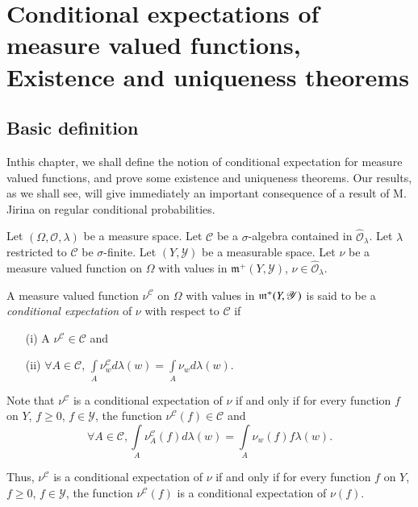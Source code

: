 
\chapter[Conditional expectations of measure valued...]{Conditional expectations of measure valued functions,
  Existence and uniqueness theorems}\label{part1:chap3}

\section{Basic definition}\label{part1:chap3:sec1}

In\pageoriginale this chapter, we shall define the notion of
conditional expectation for measure valued functions, and prove some
existence and uniqueness theorems. Our results, as we shall see, will
give immediately an important consequence of a result of M. Jirina
\cite{key1} on regular conditional probabilities. 

Let $(\Omega, \mathscr{O}, \lambda)$ be a measure space. Let
$\mathscr{C}$ be a $\sigma$-algebra contained in
$\hat{\mathscr{O}}_\lambda$. Let $\lambda$ restricted to $\mathscr{C}$
be $\sigma$-finite. Let $(Y, \mathscr{Y})$ be a measurable space. Let
$\nu$ be a measure valued function on $\Omega$ with values in
$\mathfrak{m}^+ (Y, \mathscr{Y})$, $\nu
\in\hat{\mathscr{O}}_\lambda$. 

\begin{defn}\label{part1:chap3:def22}
A measure valued function $\nu^\mathscr{C}$ on $\Omega$ with values in
$\mathfrak{m}^+ (Y,\break \mathscr{Y})$ is said to be a {\em conditional
  expectation} of $\nu$ with respect to $\mathscr{C}$ if 
\begin{itemize}
\item[{\rm (i)}] A $\nu^\mathscr{C} \in\mathscr{C}$ and 

\item[{\rm (ii)}] $\forall A \in \mathscr{C}$, $\int\limits_A
  \nu^\mathscr{C}_w d\lambda(w) = \int\limits_A \nu_w d \lambda (w)$. 
\end{itemize}
\end{defn}

Note that $\nu^\mathscr{C}$ is a conditional expectation of $\nu$ if
and only if for every function $f$ on $Y$, $f \geq 0$, $f \in
\mathscr{Y}$, the function $\nu^\mathscr{C} (f) \in \mathscr{C}$ and 
$$
\forall A \in\mathscr{C} , \int\limits_A \nu^\mathscr{C}_A (f) d
\lambda (w) = \int\limits_A \nu_w (f) f\lambda (w). 
$$

Thus, $\nu^\mathscr{C}$ is a conditional expectation of $\nu$ if and
only if for every function $f$ on $Y$, $f \geq 0$, $f \in\mathscr{Y}$,
the function $\nu^\mathscr{C}(f)$ is a conditional expectation of
$\nu(f)$. 

